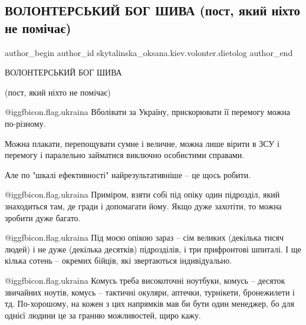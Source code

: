 
 
 
 
 
 
\subsection{ВОЛОНТЕРСЬКИЙ БОГ ШИВА (пост, який ніхто не помічає)}
\label{sec:04_06_2022.fb.skytalinska_oksana.kiev.volonter.dietolog.1.shiva}
 
\ifcmt
 author_begin
   author_id skytalinska_oksana.kiev.volonter.dietolog
 author_end
\fi

ВОЛОНТЕРСЬКИЙ БОГ ШИВА

(пост, який ніхто не помічає)

@igg{fbicon.flag.ukraina} Вболівати за Україну, прискорювати її перемогу можна по-різному. 

Можна плакати, перепощувати сумне і величне, можна лише вірити в ЗСУ і перемогу
і паралельно займатися виключно особистими справами. 

Але по "шкалі ефективності" найрезультативніше  -- це щось робити. 

@igg{fbicon.flag.ukraina}	 Приміром, взяти собі під опіку один підрозділ, який знаходиться там, де
гради і допомагати йому.  Якщо дуже захотіти, то можна зробити дуже багато. 

@igg{fbicon.flag.ukraina} Під моєю опікою зараз -- сім великих (декілька тисяч
людей) і не дуже (декілька десятків) підрозділів, і три прифронтові шпиталі. І
ще кілька сотень -- окремих бійців, які звертаються індивідуально. 

@igg{fbicon.flag.ukraina} Комусь треба високоточні ноутбуки, комусь  -- десяток
звичайних ноутів, комусь -- тактичні окуляри, аптечки, турнікети, бронежилети і
тд. По-хорошому, на кожен з цих напрямків мав би бути один менеджер, бо для
однієї людини це за гранню можливостей, щиро кажу.

